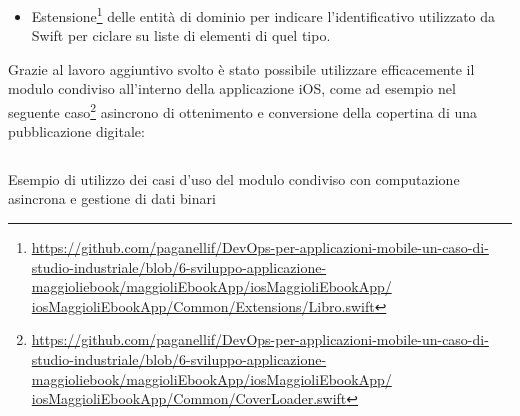 \begin{itemize}
    \item Estensione\footnote{\href{https://github.com/paganellif/DevOps-per-applicazioni-mobile-un-caso-di-studio-industriale/blob/6-sviluppo-applicazione-maggioliebook/maggioliEbookApp/iosMaggioliEbookApp/iosMaggioliEbookApp/Common/Extensions/Libro.swift}{https://github.com/paganellif/DevOps-per-applicazioni-mobile-un-caso-di-studio-industriale/blob/6-sviluppo-applicazione-maggioliebook/maggioliEbookApp/iosMaggioliEbookApp/\\iosMaggioliEbookApp/Common/Extensions/Libro.swift}} delle entità di dominio per indicare l'identificativo utilizzato da Swift per ciclare su liste di elementi di quel tipo.
\end{itemize}

Grazie al lavoro aggiuntivo svolto è stato possibile utilizzare efficacemente il modulo condiviso all'interno della applicazione iOS, come ad esempio nel seguente caso\footnote{\href{https://github.com/paganellif/DevOps-per-applicazioni-mobile-un-caso-di-studio-industriale/blob/6-sviluppo-applicazione-maggioliebook/maggioliEbookApp/iosMaggioliEbookApp/iosMaggioliEbookApp/Common/CoverLoader.swift}{https://github.com/paganellif/DevOps-per-applicazioni-mobile-un-caso-di-studio-industriale/blob/6-sviluppo-applicazione-maggioliebook/maggioliEbookApp/iosMaggioliEbookApp/\\iosMaggioliEbookApp/Common/CoverLoader.swift}} asincrono di ottenimento e conversione della copertina di una pubblicazione digitale:

\begin{listing}[H]
    \inputminted{swift}{code/CoverLoader.swift}
    \caption{Esempio di utilizzo dei casi d'uso del modulo condiviso con computazione asincrona e gestione di dati binari}
\end{listing}

